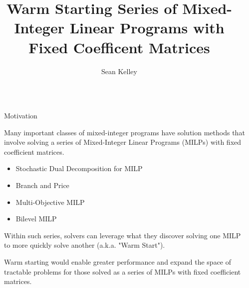 \documentclass[final]{beamer}
\title{Warm Starting Series of Mixed-Integer Linear Programs with Fixed Coefficent Matrices}
\author{Sean Kelley \inst{1}}
\institute[shortinst]{\inst{1} Lehigh University, Department of Industrial and Systems Engineering}
\newlength{\sepwidth}
\newlength{\colwidth}
\newcommand{\separatorcolumn}{\begin{column}{\sepwidth}\end{column}}
\begin{document}
\begin{frame}[t]
\begin{columns}[t]
\separatorcolumn

\begin{column}{\colwidth}

  \begin{block}{Motivation}

		Many important classes of mixed-integer programs have solution methods that involve solving a series of Mixed-Integer Linear Programs (MILPs) with fixed coefficient matrices.
		\begin{itemize}
			\item Stochastic Dual Decomposition for MILP
			\item Branch and Price
			\item Multi-Objective MILP
			\item Bilevel MILP
		\end{itemize}
		Within such series, solvers can leverage what they discover solving one MILP to more quickly solve another (a.k.a. "Warm Start").
		
		Warm starting would enable greater performance and expand the space of tractable problems for those solved as a series of MILPs with fixed coefficient matrices.

  \end{block}


\end{column}
\end{columns}
\end{frame}
\end{document}

